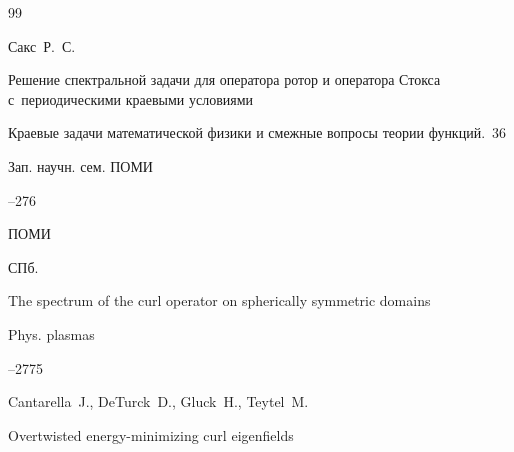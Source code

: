 \begin{thebibliography}{99}









\by Сакс~Р.~С. 

\paper Решение спектральной задачи для оператора ротор и оператора Стокса с~периодическими краевыми условиями

\inbook Краевые задачи математической физики и смежные вопросы теории функций.~36

\serial Зап. научн. сем. ПОМИ



--276

\publ ПОМИ

\publaddr СПб.
















\paper The spectrum of the curl operator on spherically symmetric domains

\jour Phys. plasmas




--2775

\by Cantarella~J., DeTurck~D., Gluck~H., Teytel~M. 





\paper Overtwisted energy-minimizing curl eigenfields


\end{thebibliography}

